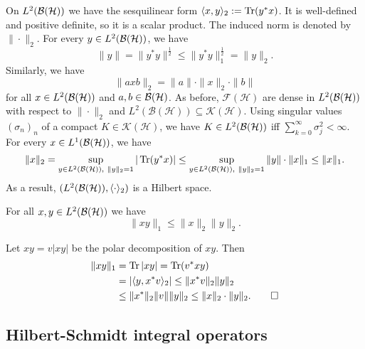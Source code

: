   On $L^2 (\operatorname{\mathcal{B} (\mathcal{H})})$ we have the sesquilinear form $\langle x, y\rangle_2 := \operatorname{Tr} (y^* x)$.
  It is well-defined and positive definite, so it is a scalar product. The induced norm is denoted by $\| \cdot \|_2$.
  For every $y \in L^2 (\operatorname{\mathcal{B} (\mathcal{H})})$, we have 
  $$\| y\| = \| y^* y\|^{\frac{1}{2}} \leq \| y^* y\|_1 ^{\frac{1}{2}} = \|y\|_2.$$
  Similarly, we have $$\| axb\|_2 = \| a\| \cdot \|x\|_2 \cdot \| b\|$$ for all $x \in L^2 (\operatorname{\mathcal{B} (\mathcal{H})})$
  and $a, b \in \operatorname{\mathcal{B} (\mathcal{H})}$. As before, $\mathcal{F} (\mathcal{H})$ are dense in $L^2 (\operatorname{\mathcal{B} (\mathcal{H})})$ with respect to $\| \cdot \|_2$ and $L^2 (\mathcal{B}(\mathcal{H})) \subseteq \mathcal{K} (\mathcal{H})$.
  Using singular values $(\sigma_n)_n$ of a compact $K \in \mathcal{K} (\mathcal{H})$, we have $K \in L^2 (\operatorname{\mathcal{B} (\mathcal{H})})$
  iff $\sum_{k = 0} ^\infty \sigma_j ^2 < \infty$.
  For every $x \in L^1 (\operatorname{\mathcal{B} (\mathcal{H})})$, we have 
  $$\| x\|_2 = \sup_{y \in L^2 (\mathcal{B}(\mathcal{H})),\ \| y\|_2 = 1} | \operatorname{Tr} (y^* x) | \leq \sup_{y \in L^2 (\operatorname{\mathcal{B} (\mathcal{H})}),\ \| y\|_2 = 1} \|y\| \cdot \| x\|_1 \leq \|x\|_1.$$
  As a result, $(L^2 (\operatorname{\mathcal{B} (\mathcal{H})}), \langle \cdot \rangle_2)$ is a Hilbert space.

\begin{theorem}
  For all $x, y \in L^2 (\operatorname{\mathcal{B} (\mathcal{H})})$ we have 
  $$\| xy\|_1 \leq \| x\|_2 \| y\|_2.$$
\end{theorem}

\begin{myproof}
  Let $xy = v|xy|$ be the polar decomposition of $xy$. Then 
  \begin{align*}
    \| xy\|_1 &= \operatorname{Tr} |xy| = \operatorname{Tr} (v^* xy)\\
    &= |\langle y, x^* v \rangle_2| \leq \| x^* v\|_2 \| y\|_2\\
    &\leq \| x^*\|_2 \| v\| \|y\|_2 \leq \| x\|_2 \cdot \|y\|_2. \qedhere
  \end{align*}
\end{myproof}

\subsection{Hilbert-Schmidt integral operators}

